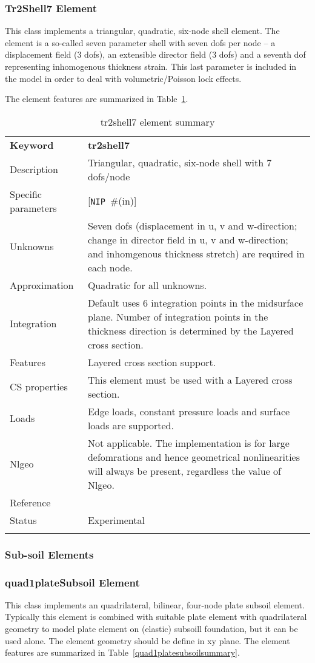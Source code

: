 \documentclass[a4paper]{article}
\newcommand{\param}[1]{\texttt{#1}} %
\newcommand{\optional}[1]{[#1]} %
\newcommand{\field}[2]{\param{#1}~\#{\tiny(#2)}} %
\newcommand{\optField}[2]{\optional{\field{#1}{#2}}}
\newcommand{\templabel}{}%
\newcommand{\tempcaption}{}%
\newcounter{nelpar}
\newenvironment{elementsummary}[5]{%
  \gdef\tempcaption{#4}%
  \gdef\templabel{#5}%
  \setcounter{nelpar}{0}%
  \begin{center} %
    \begin{table}[!htb] %
      \begin{tabular}{|l|p{9cm}|}\hline %
        {\bf Keyword} & \bf{#1}\\ %
        {Description} & {#2}\\ %
        {Specific parameters} & {#3}\\ \hline %
}{
  \\ \hline %
      \end{tabular}%
      \caption{\tempcaption}%
      \label{\templabel}%
    \end{table}%
  \end{center}%
}
\newcommand{\elementDescription}[2]{{#1} & {#2}\\ }
\begin{document}
\subsubsection{Tr2Shell7 Element} \label{tr2shell7}
This class implements a triangular, quadratic, six-node shell element. The element is a so-called seven parameter shell with seven dofs per node -- a displacement field (3 dofs), an extensible director field (3 dofs) and a seventh dof representing inhomogenous thickness strain. This last parameter is included in the model in order to deal with volumetric/Poisson lock effects.

The element features are summarized in Table~\ref{quad1mindlinsummary}.

\begin{elementsummary}{tr2shell7}{Triangular, quadratic, six-node shell with 7 dofs/node}{\optField{NIP}{in}}{tr2shell7 element summary}{quad1mindlinsummary}

\elementDescription{Unknowns}{Seven dofs (displacement in u, v and w-direction; change in director field in u, v and w-direction; and inhomgenous thickness stretch) are required in each node.}
\elementDescription{Approximation}{Quadratic for all unknowns.}
\elementDescription{Integration}{Default uses 6 integration points in the midsurface plane. Number of integration points in the thickness direction is determined by the Layered cross section.}
\elementDescription{Features}{Layered cross section support.}
\elementDescription{CS properties}{This element must be used with a Layered cross section.}
\elementDescription{Loads}{Edge loads, constant pressure loads and surface loads are supported.}
\elementDescription{Nlgeo}{Not applicable. The implementation is for large defomrations and hence geometrical nonlinearities will always be present, regardless the value of Nlgeo.}
\elementDescription{Reference}{\cite{RagnarLarsson2011}}
\elementDescription{Status}{Experimental}
\end{elementsummary}


\subsubsection{Sub-soil Elements}
\subsubsection{quad1plateSubsoil Element} \label{quad1platesubsoil}
This class implements an quadrilateral, bilinear, four-node plate subsoil element.
Typically this element is combined with suitable plate element with quadrilateral geometry to model plate element on 
(elastic) subsoill foundation, but it can be used alone. The element geometry should be define in xy plane.
The element features are summarized in Table~\ref{quad1platesubsoilsummary}.
\end{document}
